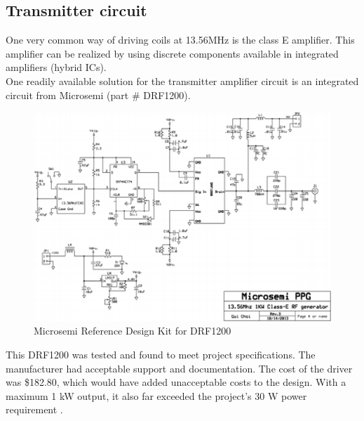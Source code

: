 \documentclass[12pt]{article}
\begin{document}
\subsection{Transmitter circuit}
\indent \indent
One very common way of driving coils at 13.56MHz is the class E amplifier. This amplifier can be realized by using discrete components available in integrated amplifiers (hybrid ICs).\\

\indent
One readily available solution for the transmitter amplifier circuit is an integrated circuit from Microsemi (part \# DRF1200).

\begin{figure}[h!]
\centering
\includegraphics[width=0.9\linewidth]{microsemi_ppg}
\caption{Microsemi Reference Design Kit for DRF1200 \cite{mdpiCoil}}
\end{figure}
\indent
This DRF1200 was tested and found to meet project specifications. The manufacturer had acceptable support and documentation. The cost of the driver was \$182.80, which would have added unacceptable costs to the design. With a maximum 1 kW output, it also far exceeded the project’s 30 W power requirement \cite{mdpiCoil}.\\
\end{document}
